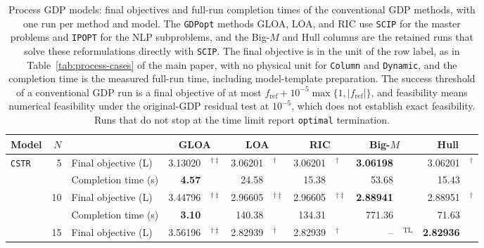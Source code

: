 \begin{table}[htbp]
\centering
\caption{Process GDP models: final objectives and full-run completion times of the conventional GDP methods, with one run per method and model.
The \texttt{GDPopt} methods GLOA, LOA, and RIC use \texttt{SCIP} for the master problems and \texttt{IPOPT} for the NLP subproblems, and the Big-\(M\) and Hull columns are the retained runs that solve these reformulations directly with \texttt{SCIP}.
The final objective is in the unit of the row label, as in Table~\ifdefined\manuscriptwithsupplement\ref{tab:process-cases}\fi{} of the main paper, with no physical unit for \texttt{Column} and \texttt{Dynamic}, and the completion time is the measured full-run time, including model-template preparation.
The success threshold of a conventional GDP run is a final objective of at most \(f_{\mathrm{ref}}+10^{-5}\max\{1,|f_{\mathrm{ref}}|\}\), and feasibility means numerical feasibility under the original-GDP residual test at \(10^{-5}\), which does not establish exact feasibility.
Runs that do not stop at the time limit report \texttt{optimal} termination.}
\label{tab:full-gdp}
\footnotesize
\setlength{\tabcolsep}{3.5pt}
\begin{threeparttable}
\begin{tabular}{@{}lrlr@{}lr@{}lr@{}lr@{}lr@{}l@{}}
\toprule
Model & \(N\) & & \multicolumn{2}{c}{GLOA} & \multicolumn{2}{c}{LOA} & \multicolumn{2}{c}{RIC} & \multicolumn{2}{c}{Big-\(M\)} & \multicolumn{2}{c}{Hull} \\
\midrule
\multirow{12}{*}{\texttt{CSTR}} & \multirow{2}{*}{5} & Final objective (L) & 3.13020 & \({}^{\dagger\ddagger}\) & 3.06201 & \({}^{\dagger}\) & 3.06201 & \({}^{\dagger}\) & \textbf{3.06198} & & 3.06201 & \({}^{\dagger}\) \\
 & & Completion time (s) & \textbf{4.57} & & 24.58 & & 15.38 & & 53.68 & & 15.43 & \\
\addlinespace[2pt]
 & \multirow{2}{*}{10} & Final objective (L) & 3.44796 & \({}^{\dagger\ddagger}\) & 2.96605 & \({}^{\dagger\ddagger}\) & 2.96605 & \({}^{\dagger\ddagger}\) & \textbf{2.88941} & & 2.88951 & \({}^{\dagger}\) \\
 & & Completion time (s) & \textbf{3.10} & & 140.38 & & 134.31 & & 771.36 & & 71.63 & \\
\addlinespace[2pt]
 & \multirow{2}{*}{15} & Final objective (L) & 3.56196 & \({}^{\dagger\ddagger}\) & 2.82939 & \({}^{\dagger}\) & 2.82939 & \({}^{\dagger}\) & -- & \({}^{\mathrm{TL}}\) & \textbf{2.82936} & \\

\end{tabular}
\end{threeparttable}
\end{table}
